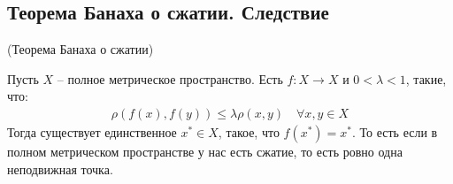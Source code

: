 \subsection{Теорема Банаха о сжатии. Следствие}

\begin{theorem} (Теорема Банаха о сжатии)

    Пусть $X$ -- полное метрическое пространство. Есть $f: X \longrightarrow X$ и $0 < \lambda < 1$, такие, что:
    \begin{gather*}
        \rho(f(x), f(y)) \leqslant \lambda \rho(x, y) \quad \forall x, y \in X
    \end{gather*}
    Тогда существует единственное $x^* \in X$, такое, что $f(x^*) = x^*$. 
    То есть если в полном метрическом пространстве у нас есть сжатие, то есть ровно одна неподвижная точка. 
\end{theorem}
